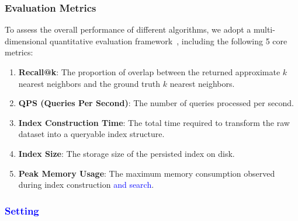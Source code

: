 \documentclass[sigconf, nonacm]{acmart}
\begin{document}
{	
	
	
	
	
	\subsubsection{Evaluation Metrics}
	
	To assess the overall performance of different algorithms, we adopt a multi-dimensional quantitative evaluation framework~\cite{compare}, including the following 5 core metrics:
	
	\begin{enumerate}
		
		\item \textbf{Recall@k}: The proportion of overlap between the returned approximate $k$ nearest neighbors and the ground truth $k$ nearest neighbors.
		\item \textbf{QPS (Queries Per Second)}: The number of queries processed per second.
		\item \textbf{Index Construction Time}: The total time required to transform the raw dataset into a queryable index structure.
		\item \textbf{Index Size}: The storage size of the persisted index on disk.
		\item \textbf{Peak Memory Usage}: The maximum memory consumption observed during index construction \textcolor{blue}{and search}.
	\end{enumerate}
	
	
	
	
	
	\subsubsection{\textcolor{blue}{Setting}}
	
}
\end{document}
